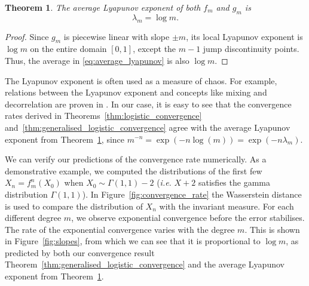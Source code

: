 \documentclass[a4paper]{article}
\newtheorem{theorem}{Theorem}%
\theoremstyle{definition}
\numberwithin{equation}{section}
\numberwithin{theorem}{section}
\begin{document}
{\begin{theorem} \label{thm:lyapunov}
    The average Lyapunov exponent of both $f_m$ and $g_m$ is
    \begin{equation*}
        \lambda_m = \log m.
    \end{equation*}
\end{theorem}
\begin{proof}
    Since $g_m$ is piecewise linear with slope $\pm m$, its local Lyapunov exponent is $\log m$ on the entire domain $[0,1]$, except the $m-1$ jump discontinuity points. Thus, the average in \eqref{eq:average_lyapunov} is also $\log m$.
\end{proof}

The Lyapunov exponent is often used as a measure of chaos. For example, relations between the Lyapunov exponent and concepts like mixing and decorrelation are proven in \cite{collet2004liapunov,butkovskii2008mixing}. In our case, it is easy to see that the convergence rates derived in Theorems~\ref{thm:logistic_convergence} and~\ref{thm:generalised_logistic_convergence} agree with the average Lyapunov exponent from Theorem~\ref{thm:lyapunov}, since $m^{-n} = \exp(-n\log(m)) = \exp(-n\lambda_m)$.

We can verify our predictions of the convergence rate numerically. As a demonstrative example, we computed the distributions of the first few $X_n=f_m^n(X_0)$ when $X_0\sim \Gamma(1,1)-2$ (\emph{i.e.} $X+2$ satisfies the gamma distribution $\Gamma(1,1)$). In Figure~\ref{fig:convergence_rate} the Wasserstein distance is used to compare the distribution of $X_n$ with the invariant measure. For each different degree $m$, we observe exponential convergence before the error stabilises. The rate of the exponential convergence varies with the degree $m$. This is shown in Figure~\ref{fig:slopes}, from which we can see that it is proportional to $\log m$, as predicted by both our convergence result Theorem~\ref{thm:generalised_logistic_convergence} and the average Lyapunov exponent from Theorem~\ref{thm:lyapunov}.

}
\end{document}
